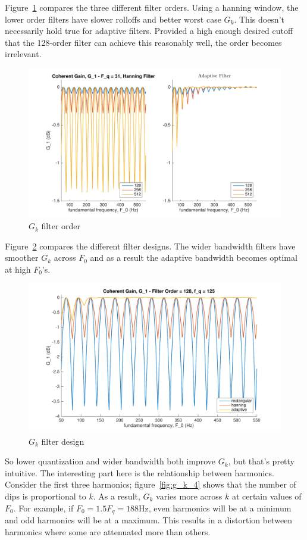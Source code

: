 \documentclass [11pt, proquest,oneside] {ganter_thesis}[2015/03/03]
\begin{document}
Figure~\ref{fig:g_k_2} compares the three different filter orders.  Using a hanning window, the lower order filters have slower rolloffs and better worst case $G_k$.  This doesn't necessarily hold true for adaptive filters.  Provided a high enough desired cutoff that the 128-order filter can achieve this reasonably well, the order becomes irrelevant.

\begin{figure}[!ht]
  \centering
    \includegraphics[width=.8\textwidth]{g_k_2}   
    \caption{$G_k$ filter order}\label{fig:g_k_2}
\end{figure}

Figure~\ref{fig:g_k_3} compares the different filter designs.  The wider bandwidth filters have smoother $G_k$ across $F_0$ and as a result the adaptive bandwidth becomes optimal at high $F_0$'s.

\begin{figure}[!ht]
  \centering
    \includegraphics[width=.8\textwidth]{g_k_3}   
    \caption{$G_k$ filter design}\label{fig:g_k_3}
\end{figure}

So lower quantization and wider bandwidth both improve $G_k$, but that's pretty intuitive.  The interesting part here is the relationship between harmonics.  Consider the first three harmonics;  figure~\ref{fig:g_k_4} shows that the number of dips is proportional to $k$.  As a result, $G_k$ varies more across $k$ at certain values of $F_0$.  For example, if $F_0 = 1.5F_q = 188$Hz, even harmonics will be at a minimum and odd harmonics will be at a maximum.  This results in a distortion between harmonics where some are attenuated more than others.
\end{document}
